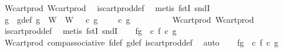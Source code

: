 \begin{isabellebody}
\ W{\isacharprime}{\kern0pt}{\isacharunderscore}{\kern0pt}cart{\isacharunderscore}{\kern0pt}prod\ W{\isacharunderscore}{\kern0pt}cart{\isacharunderscore}{\kern0pt}prod\ \isamarkupfalse%
\ is{\isacharunderscore}{\kern0pt}cart{\isacharunderscore}{\kern0pt}prod{\isacharunderscore}{\kern0pt}def\ \isamarkupfalse%
\ {\isacharparenleft}{\kern0pt}metis\ fstI\ sndI{\isacharparenright}{\kern0pt}\isanewline
\isanewline
\ \ \isamarkupfalse%
\ g\ \ g{\isacharunderscore}{\kern0pt}def{\isacharcolon}{\kern0pt}\ {\isachardoublequoteopen}g\ {\isacharcolon}{\kern0pt}\ W{\isacharprime}{\kern0pt}\ {\isasymrightarrow}\ W\ {\isasymand}\ {\isasympi}\ {\isasymcirc}\isactrlsub c\ g\ {\isacharequal}{\kern0pt}\ {\isasympi}{\isacharprime}{\kern0pt}\ {\isasymand}\ {\isasympi}\ {\isasymcirc}\isactrlsub c\ g\ {\isacharequal}{\kern0pt}\ {\isasympi}{\isacharprime}{\kern0pt}\isanewline
\ \ \ \ \ \ \isamarkupfalse%
\ W{\isacharprime}{\kern0pt}{\isacharunderscore}{\kern0pt}cart{\isacharunderscore}{\kern0pt}prod\ W{\isacharunderscore}{\kern0pt}cart{\isacharunderscore}{\kern0pt}prod\ \isamarkupfalse%
\ is{\isacharunderscore}{\kern0pt}cart{\isacharunderscore}{\kern0pt}prod{\isacharunderscore}{\kern0pt}def\ \isamarkupfalse%
\ {\isacharparenleft}{\kern0pt}metis\ fstI\ sndI{\isacharparenright}{\kern0pt}\isanewline
\isanewline
\ \ \isamarkupfalse%
\ fg{}{\isacharcolon}{\kern0pt}\ {\isachardoublequoteopen}{\isasympi}{\isacharprime}{\kern0pt}\ {\isasymcirc}\isactrlsub c\ {\isacharparenleft}{\kern0pt}f\ {\isasymcirc}\isactrlsub c\ g{\isacharparenright}{\kern0pt}\ {\isacharequal}{\kern0pt}\ {\isasympi}{\isacharprime}{\kern0pt}\isanewline
\ \ \ \ \isamarkupfalse%
\ W{\isacharprime}{\kern0pt}{\isacharunderscore}{\kern0pt}cart{\isacharunderscore}{\kern0pt}prod\ comp{\isacharunderscore}{\kern0pt}associative{}\ f{\isacharunderscore}{\kern0pt}def\ g{\isacharunderscore}{\kern0pt}def\ is{\isacharunderscore}{\kern0pt}cart{\isacharunderscore}{\kern0pt}prod{\isacharunderscore}{\kern0pt}def\ \isamarkupfalse%
\ auto\isanewline
\ \ \isamarkupfalse%
\ fg{}{\isacharcolon}{\kern0pt}\ {\isachardoublequoteopen}{\isasympi}{\isacharprime}{\kern0pt}\ {\isasymcirc}\isactrlsub c\ {\isacharparenleft}{\kern0pt}f\ {\isasymcirc}\isactrlsub c\ g{\isacharparenright}{\kern0pt}\ {\isacharequal}{\kern0pt}\ {\isasympi}{\isacharprime}{\kern0pt}\isanewline

\end{isabellebody}
